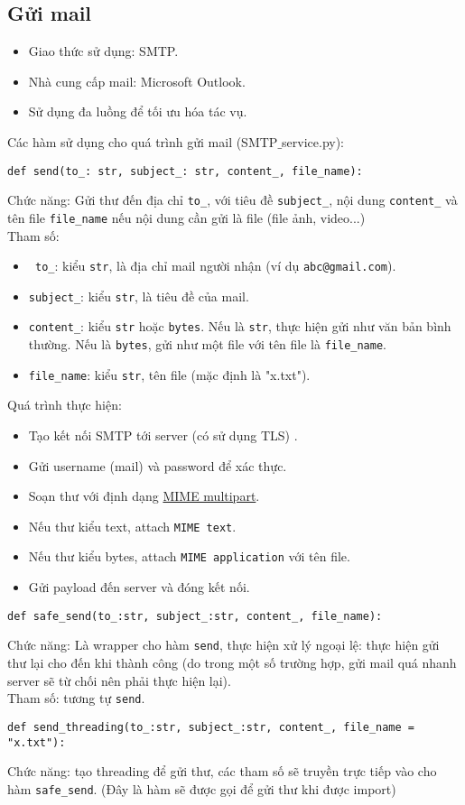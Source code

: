 \subsection{Gửi mail}
\begin{itemize}
\item Giao thức sử dụng: SMTP.
\item Nhà cung cấp mail: Microsoft Outlook.
\item Sử dụng đa luồng để tối ưu hóa tác vụ.
\end{itemize}
Các hàm sử dụng cho quá trình gửi mail (SMTP$\_$service.py):
\begin{lstlisting}
def send(to_: str, subject_: str, content_, file_name):
\end{lstlisting}
Chức năng: Gửi thư đến địa chỉ \lstinline{to_}, với tiêu đề \lstinline{subject_}, nội dung \lstinline{content_} và tên file \lstinline{file_name} nếu nội dung cần gửi là file (file ảnh, video...)\\
Tham số: 
\begin{itemize}
\item \lstinline{ to_}: kiểu \lstinline{str}, là địa chỉ mail người nhận (ví dụ \lstinline{abc@gmail.com}).
\item \lstinline{subject_}: kiểu \lstinline{str}, là tiêu đề của mail.
\item \lstinline{content_}: kiểu \lstinline{str} hoặc \lstinline{bytes}. Nếu là \lstinline{str}, thực hiện gửi như văn bản bình thường. Nếu là  \lstinline{bytes}, gửi như một file với tên file là \lstinline{file_name}.
\item \lstinline{file_name}: kiểu \lstinline{str}, tên file (mặc định là "x.txt").
\end{itemize}
Quá trình thực hiện:
\begin{itemize}
\item Tạo kết nối SMTP tới server (có sử dụng TLS) .
\item Gửi username (mail) và password để xác thực.
\item Soạn thư với định dạng \href{https://datatracker.ietf.org/doc/html/rfc1341}{MIME multipart}.
\item Nếu thư kiểu text, attach \lstinline{MIME text}.
\item Nếu thư kiểu bytes, attach \lstinline{MIME application} với tên file.
\item Gửi payload đến server và đóng kết nối.
\end{itemize}

\begin{lstlisting}
def safe_send(to_:str, subject_:str, content_, file_name):
\end{lstlisting}
Chức năng: Là wrapper cho hàm \lstinline{send}, thực hiện xử lý ngoại lệ: thực hiện gửi thư lại cho đến khi thành công (do trong một số trường hợp, gửi mail quá nhanh server sẽ từ chối nên phải thực hiện lại).\\
Tham số: tương tự \lstinline{send}.

\begin{lstlisting}
def send_threading(to_:str, subject_:str, content_, file_name = "x.txt"):
\end{lstlisting}
Chức năng: tạo threading để gửi thư, các tham số sẽ truyền trực tiếp vào cho hàm \lstinline{safe_send}. (Đây là hàm sẽ được gọi để gửi thư khi được import)\\

